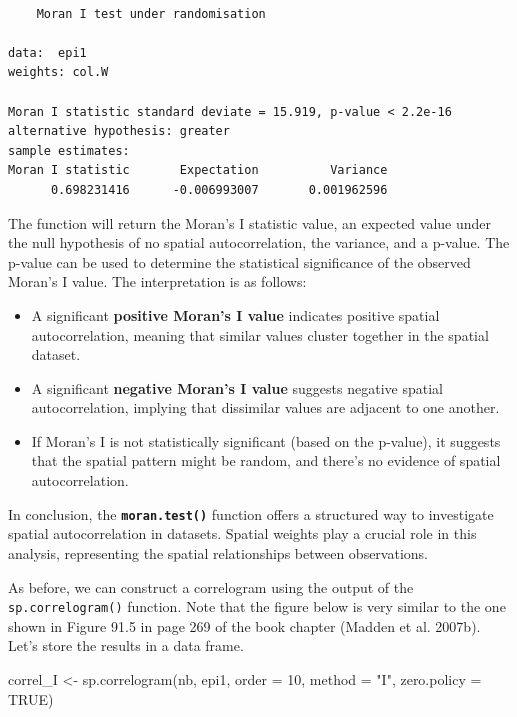 \documentclass[
  letterpaper,
]{book}
\newenvironment{Shaded}{\begin{snugshade}}{\end{snugshade}}
\newcommand{\AttributeTok}[1]{\textcolor[rgb]{0.40,0.45,0.13}{#1}}
\newcommand{\ConstantTok}[1]{\textcolor[rgb]{0.56,0.35,0.01}{#1}}
\newcommand{\DecValTok}[1]{\textcolor[rgb]{0.68,0.00,0.00}{#1}}
\newcommand{\FunctionTok}[1]{\textcolor[rgb]{0.28,0.35,0.67}{#1}}
\newcommand{\NormalTok}[1]{\textcolor[rgb]{0.00,0.23,0.31}{#1}}
\newcommand{\OtherTok}[1]{\textcolor[rgb]{0.00,0.23,0.31}{#1}}
\newcommand{\StringTok}[1]{\textcolor[rgb]{0.13,0.47,0.30}{#1}}
\begin{document}
\begin{verbatim}

    Moran I test under randomisation

data:  epi1  
weights: col.W    

Moran I statistic standard deviate = 15.919, p-value < 2.2e-16
alternative hypothesis: greater
sample estimates:
Moran I statistic       Expectation          Variance 
      0.698231416      -0.006993007       0.001962596 
\end{verbatim}

The function will return the Moran's I statistic value, an expected
value under the null hypothesis of no spatial autocorrelation, the
variance, and a p-value. The p-value can be used to determine the
statistical significance of the observed Moran's I value. The
interpretation is as follows:

\begin{itemize}
\item
  A significant \textbf{positive Moran's I value} indicates positive
  spatial autocorrelation, meaning that similar values cluster together
  in the spatial dataset.
\item
  A significant \textbf{negative Moran's I value} suggests negative
  spatial autocorrelation, implying that dissimilar values are adjacent
  to one another.
\item
  If Moran's I is not statistically significant (based on the p-value),
  it suggests that the spatial pattern might be random, and there's no
  evidence of spatial autocorrelation.
\end{itemize}

In conclusion, the \textbf{\texttt{moran.test()}} function offers a
structured way to investigate spatial autocorrelation in datasets.
Spatial weights play a crucial role in this analysis, representing the
spatial relationships between observations.

As before, we can construct a correlogram using the output of the
\texttt{sp.correlogram()} function. Note that the figure below is very
similar to the one shown in Figure 91.5 in page 269 of the book chapter
(Madden et al. 2007b). Let's store the results in a data frame.

\begin{Shaded}
\begin{Highlighting}[]
\NormalTok{correl\_I }\OtherTok{\textless{}{-}} \FunctionTok{sp.correlogram}\NormalTok{(nb, epi1, }
                           \AttributeTok{order =} \DecValTok{10}\NormalTok{,}
                           \AttributeTok{method =} \StringTok{"I"}\NormalTok{,  }
                           \AttributeTok{zero.policy =} \ConstantTok{TRUE}\NormalTok{)}
\end{Highlighting}
\end{Shaded}
\end{document}
